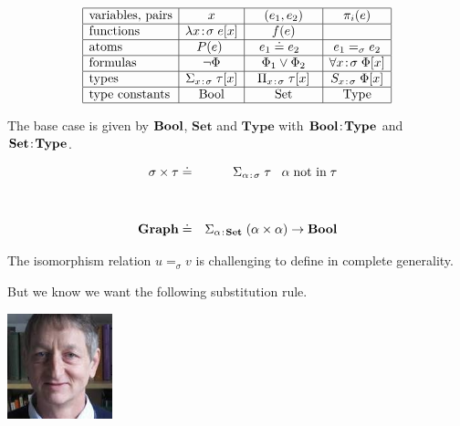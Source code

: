 {

  $$
  \begin{array}{|l|c|c|c|c|}
  \hline
    \mbox{variables, pairs} & x & (e_1,e_2) & \pi_i(e) \\ \hline 
    \mbox{functions} & \lambda \intype{x}{\sigma}\;e[x] & f(e) & \\ \hline 
    \mbox{atoms} & ~~P(e)~~~ & ~~ e_1 \doteq e_2 ~~~~ & e_1 =_\sigma e_2 \\ \hline
    \mbox{formulas} & \neg \Phi &  \Phi_1 \vee \Phi_2 & \forall \intype{x}{\sigma}\; \Phi[x] \\ \hline
    \mbox{types}   & \Sigma_{\intype{x\;}{\;\sigma}}\;\tau[x] & \Pi_{\intype{x\;}{\;\sigma}}\;\tau[x] & S_{\intype{x\;}{\;\sigma}}\;\Phi[x]  \\ \hline
    \mbox{type constants} & \mathrm{Bool} & \mathrm{Set} & \mathrm{Type} \\ \hline
  \end{array}
  $$



The base case is given by $\mathrm{\bf Bool}$, $\mathbf{Set}$ and $\mathbf{Type}$ with $\mathrm{\bf Bool}\!:\!\mathbf{Type}$ and $\mathbf{Set}\!:\!\mathbf{Type}$.


\begin{eqnarray*}
\sigma \times \tau & \doteq & \Sigma_{\alpha\;\!:\!\;\sigma}\;\tau \;\;\;\alpha\;\mbox{not in}\;\tau\\
\\
\\
\mathbf{Graph} & \doteq & \Sigma_{\alpha\;\!:\!\;\mathbf{Set}}\;(\alpha \times \alpha) \rightarrow \mathrm{\bf Bool}
\end{eqnarray*}


The isomorphism relation $u =_\sigma v$ is challenging to define in complete generality.

\vfill
But we know we want the following substitution rule.

\vfill
\centerline{
}


\includegraphics[width = 1.2in]{../images/hinton}

}
